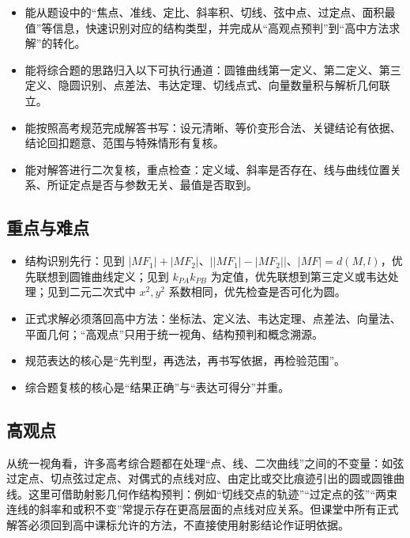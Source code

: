 \documentclass[UTF8,a4paper,11pt]{ctexart}
\begin{document}
\begin{itemize}

\item 能从题设中的“焦点、准线、定比、斜率积、切线、弦中点、过定点、面积最值”等信息，快速识别对应的结构类型，并完成从“高观点预判”到“高中方法求解”的转化。

\item 能将综合题的思路归入以下可执行通道：圆锥曲线第一定义、第二定义、第三定义、隐圆识别、点差法、韦达定理、切线点式、向量数量积与解析几何联立。

\item 能按照高考规范完成解答书写：设元清晰、等价变形合法、关键结论有依据、结论回扣题意、范围与特殊情形有复核。

\item 能对解答进行二次复核，重点检查：定义域、斜率是否存在、线与曲线位置关系、所证定点是否与参数无关、最值是否取到。

\end{itemize}

\subsection*{重点与难点}

\begin{itemize}

\item 结构识别先行：见到 $|MF_1|+|MF_2|$、$\bigl||MF_1|-|MF_2|\bigr|$、$|MF|=d(M,l)$，优先联想到圆锥曲线定义；见到 $k_{PA}k_{PB}$ 为定值，优先联想到第三定义或韦达处理；见到二元二次式中 $x^2,y^2$ 系数相同，优先检查是否可化为圆。

\item 正式求解必须落回高中方法：坐标法、定义法、韦达定理、点差法、向量法、平面几何；“高观点”只用于统一视角、结构预判和概念溯源。

\item 规范表达的核心是“先判型，再选法，再书写依据，再检验范围”。

\item 综合题复核的核心是“结果正确”与“表达可得分”并重。

\end{itemize}

\subsection*{高观点}

从统一视角看，许多高考综合题都在处理“点、线、二次曲线”之间的不变量：如弦过定点、切点弦过定点、对偶式的点线对应、由定比或交比痕迹引出的圆或圆锥曲线。这里可借助射影几何作结构预判：例如“切线交点的轨迹”“过定点的弦”“两束连线的斜率和或积不变”常提示存在更高层面的点线对应关系。但课堂中所有正式解答必须回到高中课标允许的方法，不直接使用射影结论作证明依据。
\end{document}
